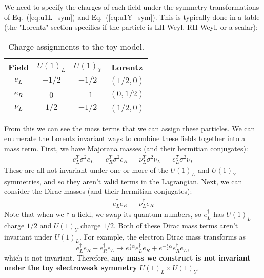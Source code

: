 \documentclass[12pt, oneside]{article}   	%
\theoremstyle{definition}
\begin{document}
\begin{itemize}
	We need to specify the charges of each field under the symmetry transformations of Eq.~(\ref{eq:u1L_sym}) and Eq.~(\ref{eq:u1Y_sym}). This is typically done in a table (the "Lorentz" section specifies if the particle is LH Weyl, RH Weyl, or a scalar):
	\begin{table}[H]
    	\setlength{\tabcolsep}{5pt}
		\centering
		\begin{tabular}{ c | ccc } \hline \hline 
		\rule{0cm}{0.4cm} Field & $U(1)_L$ & $U(1)_Y$ & Lorentz \\
		\hline
		\rule{0cm}{0.4cm} $e_L$ & $-1/2$ & $-1/2$ & $(1/2, 0)$ \\
		$e_R$ & 0 & $-1$ & $(0, 1/2)$ \\
		$\nu_L$ & $1/2$ & $-1/2$ & $(1/2, 0)$ \\
    		\hline \hline 
		\end{tabular}
		\caption{Charge assignments to the toy model. }
		\label{table:charges}
	\end{table}
	From this we can see the mass terms that we can assign these particles. We can enumerate the Lorentz invariant ways to combine these fields together into a mass term. First, we have Majorana masses (and their hermitian conjugates):
	\begin{align}
		e_L^T \sigma^2 e_L && e_R^T \sigma^2 e_R && \nu_L^T \sigma^2 \nu_L && e_L^T \sigma^2 \nu_L
	\end{align}
	These are all not invariant under one or more of the $U(1)_L$ and $U(1)_Y$ symmetries, and so they aren't valid terms in the Lagrangian. Next, we can consider the Dirac masses (and their hermitian conjugates):
	\begin{align}
		e_L^\dagger e_R && \nu_L^\dagger e_R
	\end{align}
	Note that when we $\dagger$ a field, we swap its quantum numbers, so $e_L^\dagger$ has $U(1)_L$ charge $1/2$ and $U(1)_Y$ charge $1/2$. Both of these Dirac mass terms aren't invariant under $U(1)_L$. For example, the electron Dirac mass transforms as
	\begin{equation}
		e_L^\dagger e_R + e_R^\dagger e_L\rightarrow e^{\frac{i}{2}\alpha} e_L^\dagger e_R + e^{-\frac{i}{2} \alpha} e_R^\dagger e_L,
	\end{equation}
	which is not invariant. Therefore, \textbf{any mass we construct is not invariant under the toy electroweak symmetry $U(1)_L\times U(1)_Y$}. 
	

\end{itemize}
\end{document}
